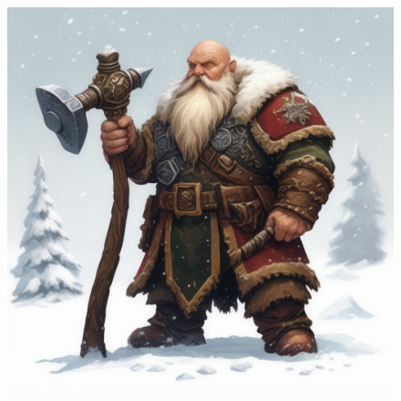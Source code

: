 

\begin{figure}[h]
\begin{center}
\includegraphics[scale=0.24]{img/ai-images/dwarf.png}
\end{center}
\end{figure}
\label{creature:dwarf}
